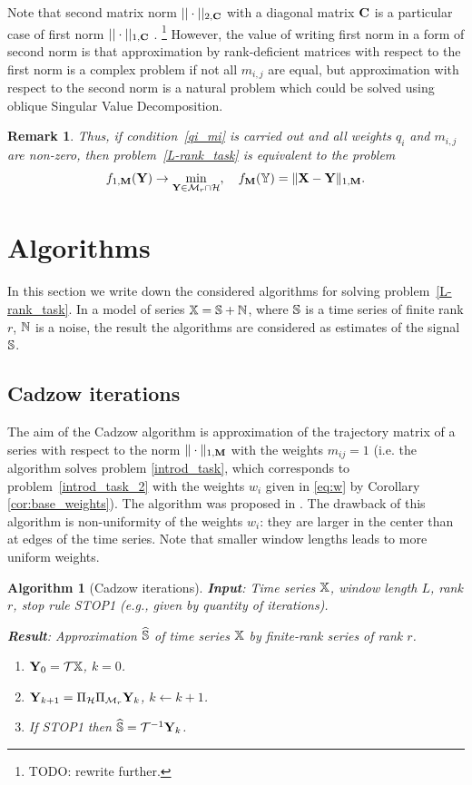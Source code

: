 \documentclass[sii]{ipart}
\newtheorem{algorithm}{Algorithm}
\newtheorem{remark}{Remark}
\begin{document}
Note that second matrix norm $||\cdot||_{2, \mathbf{C}}$ with a diagonal matrix $\mathbf{C}$ is a particular case of first norm $||\cdot||_{1, \mathbf{C}}$ . \footnote{TODO: rewrite further.} However, the value of writing first norm in a form of second norm is that approximation by rank-deficient matrices with respect to the first norm is a complex problem if not all $m_{i,j}$ are equal, but approximation with respect to the second norm is a natural problem which could be solved using oblique Singular Value Decomposition.

\begin{remark}
	\label{rem:2tasks}
	Thus, if condition~\eqref{qi_mi} is carried out and all weights $q_i$ and $m_{i,j}$ are non-zero, then problem~\eqref{L-rank_task}
	is equivalent to the problem
	\begin{equation}
	\label{rank_task}
	f_{1,\bfM}(\bfY) \to \min_{\bfY \in \calM_r \cap \calH}, \quad f_\bfM(\tsY) = \|\bfX-\bfY\|_{1,\bfM}.
	\end{equation}
\end{remark}

\section{Algorithms}
\label{sec:alg}
In this section we write down the considered algorithms for solving problem~\eqref{L-rank_task}.
In a model of series $\mathbb{X}=\mathbb{S}+\mathbb{N}$, where $\mathbb{S}$ is a time series of finite rank $r$, $\mathbb{N}$ is a noise, the result the algorithms are considered as estimates of the signal $\mathbb{S}$.

\subsection{Cadzow iterations}
The aim of the Cadzow algorithm is approximation of the trajectory matrix of a series with respect to the norm $\|\cdot\|_{1, \mathbf{M}}$ with the weights $m_{ij}=1$ (i.e. the algorithm solves problem \eqref{introd_task}, which corresponds to problem~\eqref{introd_task_2} with the weights $w_i$ given in \eqref{eq:w} by Corollary \ref{cor:base_weights}). The algorithm was proposed in \cite{Cadzow1988}. The drawback of this algorithm is non-uniformity of the weights $w_i$: they are larger in the center than at edges of the time series. Note that smaller window lengths leads to more uniform weights.

\begin{algorithm}[Cadzow iterations]
	\textbf{Input}: Time series $\mathbb{X}$, window length $L$, rank $r$,
	stop rule STOP1 (e.g., given by quantity of iterations).
	
	\textbf{Result}:
	Approximation $\widehat{\mathbb{S}}$ of time series $\mathbb{X}$ by finite-rank series of rank $r$.
	
	\begin{enumerate}
		\item
		$\mathbf{Y}_0 = \mathcal{T} \mathbb{X}$, $k=0$.
		\item
		$\mathbf{Y}_{k+1} = \Pi_{\mathcal{H}}  \Pi_{\mathcal{M}_r} \mathbf{Y}_{k}$, $k\leftarrow k+1$.
		\item
		If STOP1 then $\widehat{\mathbb{S}} = \mathcal{T}^{-1} \mathbf{Y}_k$.
	\end{enumerate}
\end{algorithm}
\end{document}
